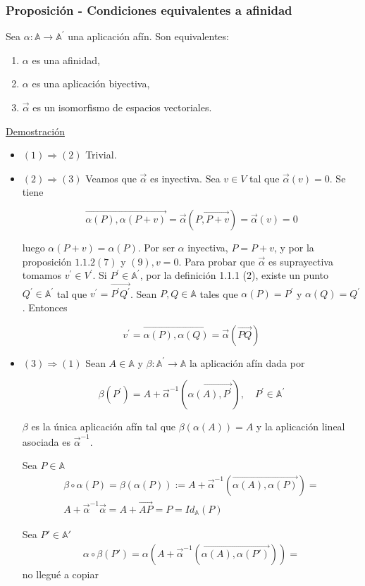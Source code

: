 \documentclass[12pt, a4paper, ones, notitlepage, openany,titlepage]{article}
\newcommand{\demostracion}{\noindent\underline{Demostración}}
\begin{document}
\subsubsection{Proposición - Condiciones equivalentes a afinidad}
	\noindent Sea $\alpha: \mathbb{A} \rightarrow \mathbb{A}^{\prime}$ una aplicación afín. Son equivalentes:
	\begin{enumerate}[label=(\arabic*)]
		\item $\alpha$ es una afinidad,
		
		\item $\alpha$ es una aplicación biyectiva,
		
		\item $\vec{\alpha}$ es un isomorfismo de espacios vectoriales.
	\end{enumerate}

\demostracion 
	\begin{itemize}
		\item$(1) \Rightarrow(2)$ Trivial.
		
		\item$(2) \Rightarrow(3)$ Veamos que $\vec{\alpha}$ es inyectiva. Sea $v \in V$ tal que $\vec{\alpha}(v)=0$. Se tiene
		
		$$
		\overrightarrow{\alpha(P), \alpha(P+v)}=\vec{\alpha}(\overrightarrow{P, P+v})=\vec{\alpha}(v)=0
		$$
		
		luego $\alpha(P+v)=\alpha(P)$. Por ser $\alpha$ inyectiva, $P=P+v$, y por la proposición $1.1 .2(7)$ y $(9), v=0$. Para probar que $\vec{\alpha}$ es suprayectiva tomamos $v^{\prime} \in V^{\prime}$. Si $P^{\prime} \in \mathbb{A}^{\prime}$, por la definición 1.1.1 (2), existe un punto $Q^{\prime} \in \mathbb{A}^{\prime}$ tal que $v^{\prime}=\overrightarrow{P^{\prime} Q^{\prime}}$. Sean $P, Q \in \mathbb{A}$ tales que $\alpha(P)=P^{\prime}$ y $\alpha(Q)=Q^{\prime}$. Entonces
		
		$$
		v^{\prime}=\overrightarrow{\alpha(P), \alpha(Q)}=\vec{\alpha}(\overrightarrow{P Q})
		$$
		
		\item$(3) \Rightarrow(1)$ Sean $A \in \mathbb{A}$ y $\beta: \mathbb{A}^{\prime} \rightarrow \mathbb{A}$ la aplicación afín dada por
		
		$$
		\beta\left(P^{\prime}\right)=A+\vec{\alpha}^{-1}\left(\overrightarrow{\alpha(A), P^{\prime}}\right), \quad P^{\prime} \in \mathbb{A}^{\prime}
		$$
		
		$\beta$ es la única aplicación afín tal que $\beta(\alpha(A))=A$ y la aplicación lineal asociada es $\vec{\alpha}^{-1}$.
		
		Sea $P\in\mathbb{A}$
		\begin{gather*}
			\beta\circ\alpha(P)=\beta(\alpha(P)):=A+\vec{\alpha}^{-1}(\overrightarrow{\alpha(A),\alpha(P)}) =\\ A+\vec{\alpha}^{-1}\vec{\alpha}=A+\overrightarrow{AP}=P=Id_{\mathbb{A}}(P)
		\end{gather*}
		
		Sea $P'\in\mathbb{A'}$
		\begin{gather*}
			\alpha\circ\beta(P')=\alpha(A+\vec{\alpha}^{-1}(\overrightarrow{\alpha(A),\alpha(P')})) = 
		\end{gather*} no llegué a copiar
	\end{itemize}
\end{document}
